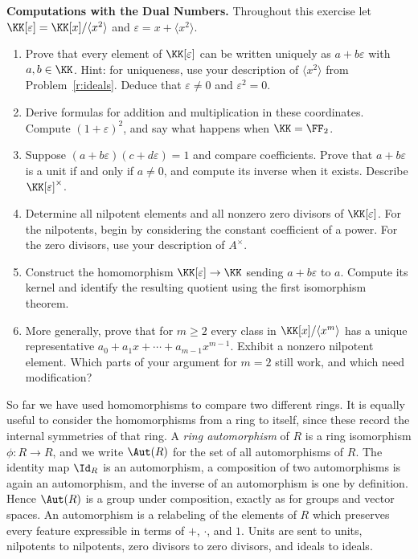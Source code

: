 \documentclass[12pt,reqno]{amsart}
\begin{document}
\begin{problems}
\item\label{r:dual} \textbf{Computations with the Dual Numbers.} Throughout this exercise let $\KK[\varepsilon]=\KK[x]/\langle x^2\rangle$ and $\varepsilon=x+\langle x^2\rangle$.
\begin{enumerate}
\item Prove that every element of $\KK[\varepsilon]$ can be written uniquely as $a+b\varepsilon$ with $a,b\in\KK$. Hint: for uniqueness, use your description of $\langle x^2\rangle$ from Problem~\ref{r:ideals}. Deduce that $\varepsilon\ne0$ and $\varepsilon^2=0$.
\item Derive formulas for addition and multiplication in these coordinates. Compute $(1+\varepsilon)^2$, and say what happens when $\KK=\FF_2$.
\item Suppose $(a+b\varepsilon)(c+d\varepsilon)=1$ and compare coefficients. Prove that $a+b\varepsilon$ is a unit if and only if $a\ne0$, and compute its inverse when it exists. Describe $\KK[\varepsilon]^\times$.
\item Determine all nilpotent elements and all nonzero zero divisors of $\KK[\varepsilon]$. For the nilpotents, begin by considering the constant coefficient of a power. For the zero divisors, use your description of $A^\times$.
\item Construct the homomorphism $\KK[\varepsilon]\to\KK$ sending $a+b\varepsilon$ to $a$. Compute its kernel and identify the resulting quotient using the first isomorphism theorem.
\item More generally, prove that for $m\geq2$ every class in $\KK[x]/\langle x^m\rangle$ has a unique representative $a_0+a_1x+\cdots+a_{m-1}x^{m-1}$. Exhibit a nonzero nilpotent element. Which parts of your argument for $m=2$ still work, and which need modification?
\end{enumerate}
\end{problems}
 
\hrulefill
 
 
So far we have used homomorphisms to compare two different rings. It is equally useful to consider the homomorphisms from a ring to itself, since these record the internal symmetries of that ring. A \emph{ring automorphism} of $R$ is a ring isomorphism $\phi:R\to R$, and we write $\Aut(R)$ for the set of all automorphisms of $R$. The identity map $\Id_R$ is an automorphism, a composition of two automorphisms is again an automorphism, and the inverse of an automorphism is one by definition. Hence $\Aut(R)$ is a group under composition, exactly as for groups and vector spaces. An automorphism is a relabeling of the elements of $R$ which preserves every feature expressible in terms of $+$, $\cdot$, and $1$. Units are sent to units, nilpotents to nilpotents, zero divisors to zero divisors, and ideals to ideals.  
\end{document}
